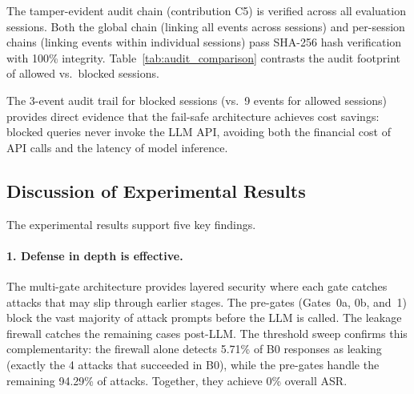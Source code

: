 \documentclass[journal,12pt,onecolumn,draftclsnofoot]{IEEEtran}
\begin{document}
The tamper-evident audit chain (contribution C5) is verified across all evaluation sessions. Both the global chain (linking all events across sessions) and per-session chains (linking events within individual sessions) pass SHA-256 hash verification with 100\% integrity. Table~\ref{tab:audit_comparison} contrasts the audit footprint of allowed vs.\ blocked sessions.

\begin{table}[!ht]
    \centering
    \caption{Audit Chain: Allowed vs.\ Blocked Session Comparison}
    \label{tab:audit_comparison}
\end{table}

The 3-event audit trail for blocked sessions (vs.\ 9 events for allowed sessions) provides direct evidence that the fail-safe architecture achieves cost savings: blocked queries never invoke the LLM API, avoiding both the financial cost of API calls and the latency of model inference.

\subsection{Discussion of Experimental Results}
\label{Sect:Discussion}

The experimental results support five key findings.

\paragraph{1. Defense in depth is effective.}
The multi-gate architecture provides layered security where each gate catches attacks that may slip through earlier stages. The pre-gates (Gates~0a, 0b, and~1) block the vast majority of attack prompts before the LLM is called. The leakage firewall catches the remaining cases post-LLM. The threshold sweep confirms this complementarity: the firewall alone detects 5.71\% of B0 responses as leaking (exactly the 4 attacks that succeeded in B0), while the pre-gates handle the remaining 94.29\% of attacks. Together, they achieve 0\% overall ASR.
\end{document}
